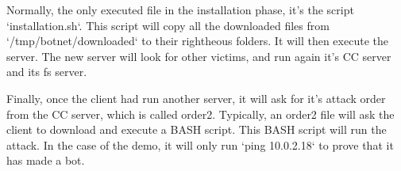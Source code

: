 \documentclass[../main.tex]{subfiles}
\begin{document}
    Normally, the only executed file in the installation phase, it's the script `installation.sh`.
    This script will copy all the downloaded files from `/tmp/botnet/downloaded` to their rightheous folders.
    It will then execute the server.
    The new server will look for other victims, and run again it's CC server and its fs server.

    Finally, once the client had run another server, it will ask for it's attack order from the CC server, which is called order2.
    Typically, an order2 file will ask the client to download and execute a BASH script.
    This BASH script will run the attack.
    In the case of the demo, it will only run `ping 10.0.2.18` to prove that it has made a bot.


    
\end{document}
